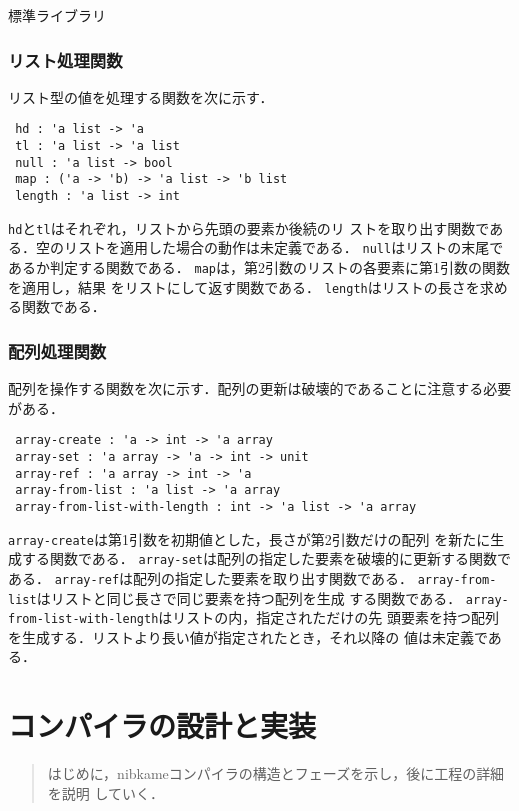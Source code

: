 \documentclass[a4paper,titlepage,report]{jsbook}
\begin{document}
\begin{resbonsiblesection}{標準ライブラリ}{\kobori}
\subsection{リスト処理関数}
リスト型の値を処理する関数を次に示す．
\begin{lstlisting}
 hd : 'a list -> 'a
 tl : 'a list -> 'a list
 null : 'a list -> bool
 map : ('a -> 'b) -> 'a list -> 'b list
 length : 'a list -> int
\end{lstlisting}
\lstinline|hd|と\lstinline|tl|はそれぞれ，リストから先頭の要素か後続のリ
ストを取り出す関数である．空のリストを適用した場合の動作は未定義である．
\lstinline|null|はリストの末尾であるか判定する関数である．
\lstinline|map|は，第2引数のリストの各要素に第1引数の関数を適用し，結果
をリストにして返す関数である．
\lstinline|length|はリストの長さを求める関数である．

\subsection{配列処理関数}
配列を操作する関数を次に示す．配列の更新は破壊的であることに注意する必要
がある．
\begin{lstlisting}
 array-create : 'a -> int -> 'a array
 array-set : 'a array -> 'a -> int -> unit
 array-ref : 'a array -> int -> 'a
 array-from-list : 'a list -> 'a array
 array-from-list-with-length : int -> 'a list -> 'a array
\end{lstlisting}
\lstinline|array-create|は第1引数を初期値とした，長さが第2引数だけの配列
を新たに生成する関数である．
\lstinline|array-set|は配列の指定した要素を破壊的に更新する関数である．
\lstinline|array-ref|は配列の指定した要素を取り出す関数である．
\lstinline|array-from-list|はリストと同じ長さで同じ要素を持つ配列を生成
する関数である．
\lstinline|array-from-list-with-length|はリストの内，指定されただけの先
頭要素を持つ配列を生成する．リストより長い値が指定されたとき，それ以降の%
値は未定義である．

\end{resbonsiblesection}

\chapter{コンパイラの設計と実装}\label{ch:impl}

\begin{abstract}
はじめに，nibkameコンパイラの構造とフェーズを示し，後に工程の詳細を説明
していく．
\end{abstract}
\end{document}

